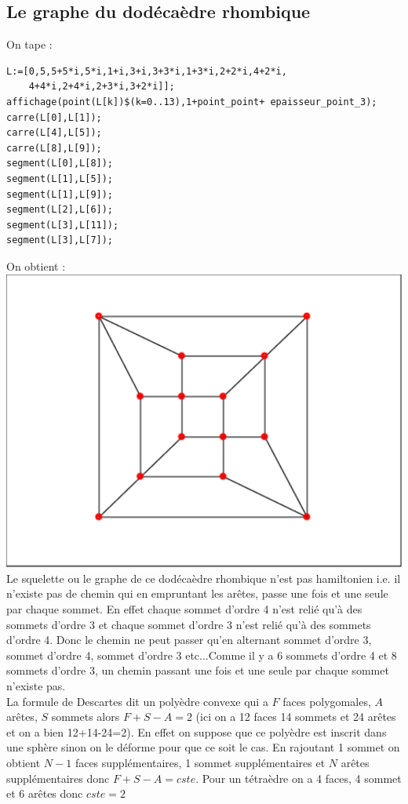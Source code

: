 \documentclass[a4paper,11pt]{book}
\begin{document}
\subsection{Le graphe du dod\'eca\`edre rhombique}
On tape :
\begin{verbatim}
L:=[0,5,5+5*i,5*i,1+i,3+i,3+3*i,1+3*i,2+2*i,4+2*i,
    4+4*i,2+4*i,2+3*i,3+2*i]];
affichage(point(L[k])$(k=0..13),1+point_point+ epaisseur_point_3);
carre(L[0],L[1]);
carre(L[4],L[5]);
carre(L[8],L[9]);
segment(L[0],L[8]);
segment(L[1],L[5]);
segment(L[1],L[9]);
segment(L[2],L[6]);
segment(L[3],L[11]);
segment(L[3],L[7]);
\end{verbatim}
On obtient :\\
\includegraphics[width=\textwidth]{graphdodeca}\\
Le squelette ou le graphe de ce dod\'eca\`edre rhombique n'est pas hamiltonien
i.e. il n'existe pas de chemin qui en empruntant les ar\^etes, passe une fois 
et une seule par chaque sommet. En effet chaque sommet d'ordre 4 n'est reli\'e 
qu'\`a  des sommets d'ordre 3 et  chaque sommet d'ordre 3 n'est reli\'e 
qu'\`a  des sommets d'ordre 4. Donc le chemin ne peut passer qu'en alternant 
sommet d'ordre 3, sommet d'ordre 4, sommet d'ordre 3 etc...Comme il y a 6 
sommets d'ordre 4 et 8 sommets d'ordre 3, un chemin passant une fois 
et une seule par chaque sommet n'existe pas.\\
La formule de Descartes dit un poly\`edre convexe qui a $F$ faces polygomales, $A$ ar\^etes, $S$ sommets alors $F+S-A=2$ (ici on a 12 faces 14 sommets et 
24 ar\^etes et on a bien 12+14-24=2).
En effet on suppose que ce poly\`edre est inscrit dans une sph\`ere sinon on 
le d\'eforme pour que ce soit le cas. En rajoutant 1 sommet on obtient $N-1$ 
faces suppl\'ementaires, 1 sommet suppl\'ementaires et $N$ ar\^etes 
suppl\'ementaires donc $F+S-A=cste$. Pour un t\'etra\`edre on a 4 faces,
4 sommet et 6 ar\^etes donc $cste=2$
\end{document}
